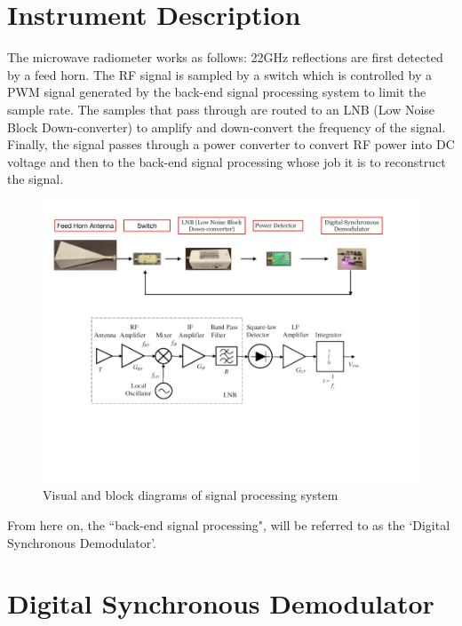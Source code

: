 \documentclass[titlepage]{article}
\begin{document}
\section{Instrument Description}
\label{instrunment description}

The microwave radiometer works as follows: 22GHz reflections are first detected by a feed horn. The RF signal is sampled by a switch which is controlled by a PWM signal generated by the back-end signal processing system to limit the sample rate. The samples that pass through are routed to an LNB (Low Noise Block Down-converter) to amplify and down-convert the frequency of the signal. Finally, the signal passes through a power converter to convert RF power into DC voltage and then to the back-end signal processing whose job it is to reconstruct the signal.

\newpage

\begin{figure}[h]
    \includegraphics[width=\textwidth]{assets/flow_chart.png}
    \centering
    \caption{Visual and block diagrams of signal processing system}
\end{figure}
\label{figure2}

\noindent
From here on, the ``back-end signal processing", will be referred to as the `Digital Synchronous Demodulator'.


\section{Digital Synchronous Demodulator}
\label{digital synchronous demodulator}
\end{document}
